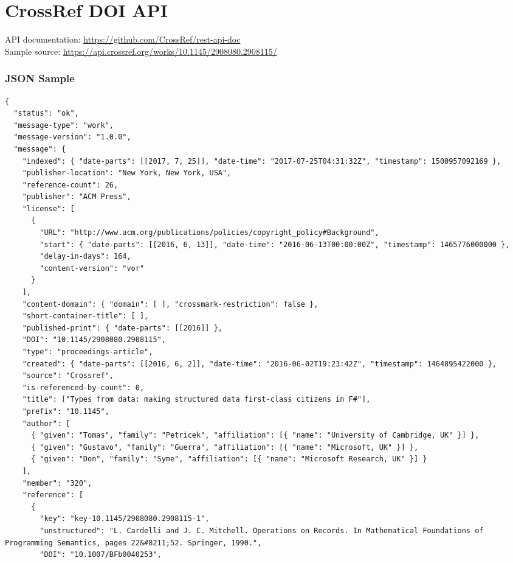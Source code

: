 \section{CrossRef DOI API}

API documentation: \url{https://github.com/CrossRef/rest-api-doc} \\
Sample source: \url{https://api.crossref.org/works/10.1145/2908080.2908115/}

\subsubsection{JSON Sample}

\begin{multicols}{2}
\begin{verbatim}
{
  "status": "ok",
  "message-type": "work",
  "message-version": "1.0.0",
  "message": {
    "indexed": { "date-parts": [[2017, 7, 25]], "date-time": "2017-07-25T04:31:32Z", "timestamp": 1500957092169 },
    "publisher-location": "New York, New York, USA",
    "reference-count": 26,
    "publisher": "ACM Press",
    "license": [
      {
        "URL": "http://www.acm.org/publications/policies/copyright_policy#Background",
        "start": { "date-parts": [[2016, 6, 13]], "date-time": "2016-06-13T00:00:00Z", "timestamp": 1465776000000 },
        "delay-in-days": 164,
        "content-version": "vor"
      }
    ],
    "content-domain": { "domain": [ ], "crossmark-restriction": false },
    "short-container-title": [ ],
    "published-print": { "date-parts": [[2016]] },
    "DOI": "10.1145/2908080.2908115",
    "type": "proceedings-article",
    "created": { "date-parts": [[2016, 6, 2]], "date-time": "2016-06-02T19:23:42Z", "timestamp": 1464895422000 },
    "source": "Crossref",
    "is-referenced-by-count": 0,
    "title": ["Types from data: making structured data first-class citizens in F#"],
    "prefix": "10.1145",
    "author": [
      { "given": "Tomas", "family": "Petricek", "affiliation": [{ "name": "University of Cambridge, UK" }] },
      { "given": "Gustavo", "family": "Guerra", "affiliation": [{ "name": "Microsoft, UK" }] },
      { "given": "Don", "family": "Syme", "affiliation": [{ "name": "Microsoft Research, UK" }] }
    ],
    "member": "320",
    "reference": [
      {
        "key": "key-10.1145/2908080.2908115-1",
        "unstructured": "L. Cardelli and J. C. Mitchell. Operations on Records. In Mathematical Foundations of Programming Semantics, pages 22&#8211;52. Springer, 1990.",
        "DOI": "10.1007/BFb0040253",

\end{verbatim}
\end{multicols}
